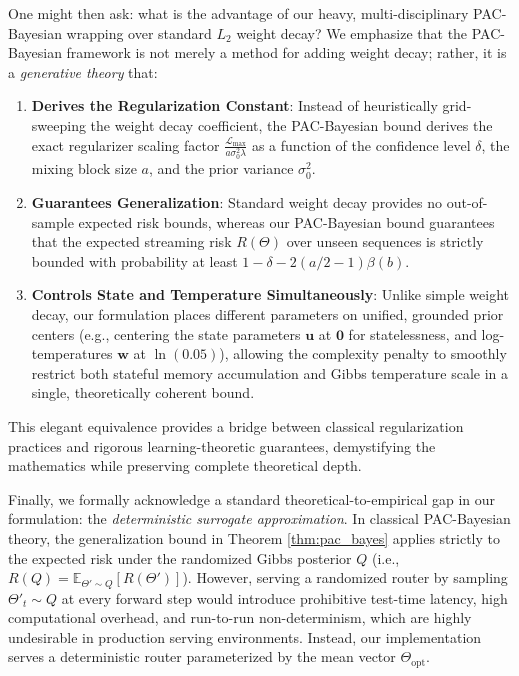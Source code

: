 One might then ask: what is the advantage of our heavy, multi-disciplinary PAC-Bayesian wrapping over standard $L_2$ weight decay? We emphasize that the PAC-Bayesian framework is not merely a method for adding weight decay; rather, it is a \emph{generative theory} that:
\begin{enumerate}
    \item \textbf{Derives the Regularization Constant}: Instead of heuristically grid-sweeping the weight decay coefficient, the PAC-Bayesian bound derives the exact regularizer scaling factor $\frac{\mathcal{L}_{\max}}{a \sigma_0^2 \lambda}$ as a function of the confidence level $\delta$, the mixing block size $a$, and the prior variance $\sigma_0^2$.
    \item \textbf{Guarantees Generalization}: Standard weight decay provides no out-of-sample expected risk bounds, whereas our PAC-Bayesian bound guarantees that the expected streaming risk $R(\Theta)$ over unseen sequences is strictly bounded with probability at least $1-\delta - 2(a/2-1)\beta(b)$.
    \item \textbf{Controls State and Temperature Simultaneously}: Unlike simple weight decay, our formulation places different parameters on unified, grounded prior centers (e.g., centering the state parameters $\mathbf{u}$ at $\mathbf{0}$ for statelessness, and log-temperatures $\mathbf{w}$ at $\ln(0.05)$), allowing the complexity penalty to smoothly restrict both stateful memory accumulation and Gibbs temperature scale in a single, theoretically coherent bound.
\end{enumerate}
This elegant equivalence provides a bridge between classical regularization practices and rigorous learning-theoretic guarantees, demystifying the mathematics while preserving complete theoretical depth.

Finally, we formally acknowledge a standard theoretical-to-empirical gap in our formulation: the \emph{deterministic surrogate approximation}. In classical PAC-Bayesian theory, the generalization bound in Theorem \ref{thm:pac_bayes} applies strictly to the expected risk under the randomized Gibbs posterior $Q$ (i.e., $R(Q) = \mathbb{E}_{\Theta' \sim Q}[R(\Theta')]$). However, serving a randomized router by sampling $\Theta'_t \sim Q$ at every forward step would introduce prohibitive test-time latency, high computational overhead, and run-to-run non-determinism, which are highly undesirable in production serving environments. Instead, our implementation serves a deterministic router parameterized by the mean vector $\Theta_{\text{opt}}$.

